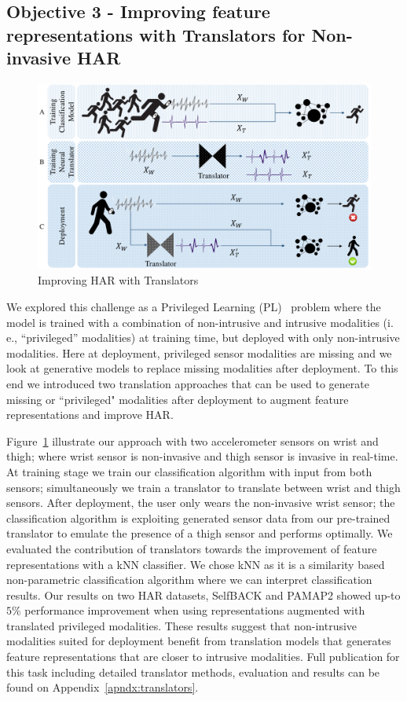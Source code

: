 \documentclass[runningheads]{llncs}
\begin{document}
\subsection{Objective 3 - Improving feature representations with Translators for Non-invasive HAR}
\begin{figure}[ht]
\centering
\includegraphics[width=1\textwidth]{e.pdf}
\caption{Improving HAR with Translators}
\label {fig:tran}
\end{figure}
We explored this challenge as a Privileged Learning (PL)~\cite{vapnik2009new} problem where the model is trained with a combination of non-intrusive and intrusive modalities (i. e., ``privileged'' modalities) at training time, but deployed with only non-intrusive modalities. 
Here at deployment, privileged sensor modalities are missing and we look at generative models to replace missing modalities after deployment. 
To this end we introduced two translation approaches that can be used to generate missing or ``privileged" modalities after deployment to augment feature representations and improve HAR.

Figure~\ref{fig:tran} illustrate our approach with two accelerometer sensors on wrist and thigh; where wrist sensor is non-invasive and thigh sensor is invasive in real-time. At training stage we train our classification algorithm with input from both sensors; simultaneously we train a translator to translate between wrist and thigh sensors. After deployment, the user only wears the non-invasive wrist sensor; the classification algorithm is exploiting generated sensor data from our pre-trained translator to emulate the presence of a thigh sensor and performs optimally.
We evaluated the contribution of translators towards the improvement of feature representations with a kNN classifier. We chose kNN as it is a similarity based non-parametric classification algorithm where we can interpret classification results. 
Our results on two HAR datasets, SelfBACK and PAMAP2 showed up-to $5\%$ performance improvement when using representations augmented with translated privileged modalities.
These results suggest that non-intrusive modalities suited for deployment benefit from translation models that generates feature representations that are closer to intrusive modalities.
Full publication for this task including detailed translator methods, evaluation and results can be found on Appendix~\ref{apndx:translators}. 
\end{document}
